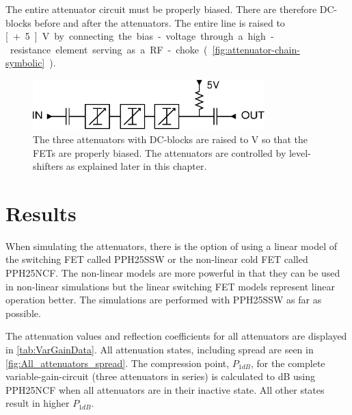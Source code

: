
The entire attenuator circuit must be properly biased. There are therefore DC-blocks before and after the attenuators. The entire line is raised to \unit[+5]{V} by connecting the bias-voltage through a high-resistance element serving as a RF-choke (\autoref{fig:attenuator-chain-symbolic}).

		\begin{figure}[h!]
			\centering
			\includegraphics[width=0.8\textwidth]{fig/attenuators/attenuator-chain-symbolic}
			\caption[The attenuator-circuit schematically]{The three attenuators with DC-blocks are raised to \unit[5]{V} so that the FETs are properly biased. The attenuators are controlled by level-shifters as explained later in this chapter.}\label{fig:attenuator-chain-symbolic}
		\end{figure}

	
	\section{Results}
		
		When simulating the attenuators, there is the option of using a linear model of the switching FET called PPH25SSW or the non-linear cold FET called PPH25NCF. The non-linear models are more powerful in that they can be used in non-linear simulations but the linear switching FET  models represent linear operation better. The simulations are performed with PPH25SSW as far as possible.		
		
		The attenuation values and reflection coefficients for all attenuators are displayed in \autoref{tab:VarGainData}. All attenuation states, including spread are seen in \autoref{fig:All_attenuators_spread}. The compression point, $P_{1dB}$, for the complete variable-gain-circuit (three attenuators in series) is calculated to \unit[22]{dB} using PPH25NCF when all attenuators are in their inactive state. All other states result in higher $P_{1dB}$.
	
	
	
